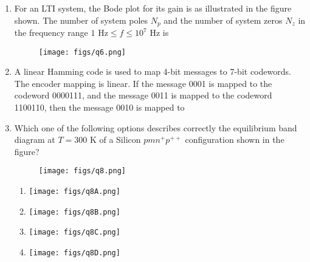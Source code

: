 \documentclass[a4paper, 11pt]{article}
\begin{document}
\begin{enumerate}
    \item For an LTI system, the Bode plot for its gain is as illustrated in the figure shown. The number of system poles $N_{p}$ and the number of system zeros $N_{z}$ in the frequency range $1 \text{ Hz} \le f \le 10^{7} \text{ Hz}$ is
    
    \begin{figure}[H]
        \centering
        \texttt{[image: figs/q6.png]}
        \caption*{}
        \label{fig:q6}
    \end{figure}
    
    \begin{enumerate}
    \end{enumerate}

    \hfill{}

    \item A linear Hamming code is used to map 4-bit messages to 7-bit codewords. The encoder mapping is linear. If the message 0001 is mapped to the codeword 0000111, and the message 0011 is mapped to the codeword 1100110, then the message 0010 is mapped to
    \begin{enumerate}
    \end{enumerate}

    \hfill{}

    \item Which one of the following options describes correctly the equilibrium band diagram at $T=300$ K of a Silicon $pmn^{+}p^{++}$ configuration shown in the figure?
    \begin{figure}[H]
        \centering
        \texttt{[image: figs/q8.png]}
        \caption*{}
        \label{fig:q8}
    \end{figure}
    \begin{enumerate}
            \item \texttt{[image: figs/q8A.png]}
            \item \texttt{[image: figs/q8B.png]}
            \item \texttt{[image: figs/q8C.png]}
            \item \texttt{[image: figs/q8D.png]}
    \end{enumerate}
    

\end{enumerate}
\end{document}
